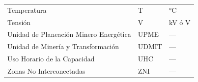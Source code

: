 \begin{longtable}{p{8.5cm} p{3cm} p{2cm}}
Temperatura                                               & T        & °C        \\
Tensión                                                   & V        & kV ó V    \\
Unidad de Planeación Minero Energética                    & UPME     & ---       \\
Unidad de Minería y Transformación                        & UDMIT    & ---       \\
Uso Horario de la Capacidad                               & UHC      & ---       \\
Zonas No Interconectadas                                  & ZNI      & ---       \\

\end{longtable}

